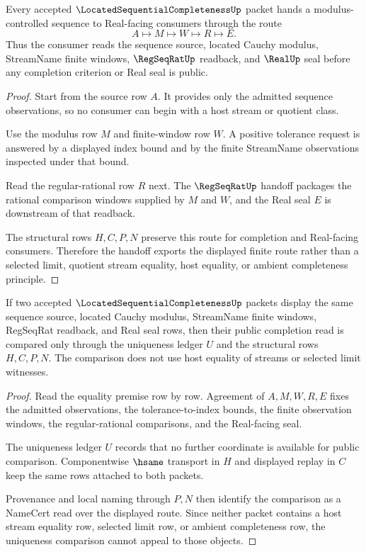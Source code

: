\begin{theorem}
\label{thm:located-sequential-completeness-regseqrat-handoff}
Every accepted $\LocatedSequentialCompletenessUp$ packet hands a modulus-controlled sequence to Real-facing consumers through the route
$$
A\longmapsto M\longmapsto W\longmapsto R\longmapsto E .
$$
Thus the consumer reads the sequence source, located Cauchy modulus, StreamName finite windows, $\RegSeqRatUp$ readback, and $\RealUp$ seal before any completion criterion or Real seal is public.
\end{theorem}
\begin{proof}
Start from the source row $A$. It provides only the admitted sequence observations, so no consumer can begin with a host stream or quotient class.

Use the modulus row $M$ and finite-window row $W$. A positive tolerance request is answered by a displayed index bound and by the finite StreamName observations inspected under that bound.

Read the regular-rational row $R$ next. The $\RegSeqRatUp$ handoff packages the rational comparison windows supplied by $M$ and $W$, and the Real seal $E$ is downstream of that readback.

The structural rows $H,C,P,N$ preserve this route for completion and Real-facing consumers. Therefore the handoff exports the displayed finite route rather than a selected limit, quotient stream equality, host equality, or ambient completeness principle.
\end{proof}

\begin{theorem}
\label{thm:located-sequential-completeness-uniqueness-ledger}
If two accepted $\LocatedSequentialCompletenessUp$ packets display the same sequence source, located Cauchy modulus, StreamName finite windows, RegSeqRat readback, and Real seal rows, then their public completion read is compared only through the uniqueness ledger $U$ and the structural rows $H,C,P,N$. The comparison does not use host equality of streams or selected limit witnesses.
\end{theorem}
\begin{proof}
Read the equality premise row by row. Agreement of $A,M,W,R,E$ fixes the admitted observations, the tolerance-to-index bounds, the finite observation windows, the regular-rational comparisons, and the Real-facing seal.

The uniqueness ledger $U$ records that no further coordinate is available for public comparison. Componentwise $\hsame$ transport in $H$ and displayed replay in $C$ keep the same rows attached to both packets.

Provenance and local naming through $P,N$ then identify the comparison as a NameCert read over the displayed route. Since neither packet contains a host stream equality row, selected limit row, or ambient completeness row, the uniqueness comparison cannot appeal to those objects.
\end{proof}


